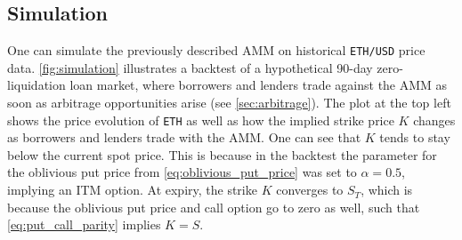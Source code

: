 \documentclass[a4paper]{article}
\begin{document}



\subsection{Simulation}
One can simulate the previously described AMM on historical \verb|ETH/USD| price data. \cref{fig:simulation} illustrates a backtest of a hypothetical 90-day zero-liquidation loan market, where borrowers and lenders trade against the AMM as soon as arbitrage opportunities arise (see \cref{sec:arbitrage}). The plot at the top left shows the price evolution of \verb|ETH| as well as how the implied strike price $K$ changes as borrowers and lenders trade with the AMM. One can see that $K$ tends to stay below the current spot price. This is because in the backtest the parameter for the oblivious put price from \cref{eq:oblivious_put_price} was set to $\alpha=0.5$, implying an ITM option. At expiry, the strike $K$ converges to $S_T$, which is because the oblivious put price and call option go to zero as well, such that \cref{eq:put_call_parity} implies $K=S$.\\
\end{document}

